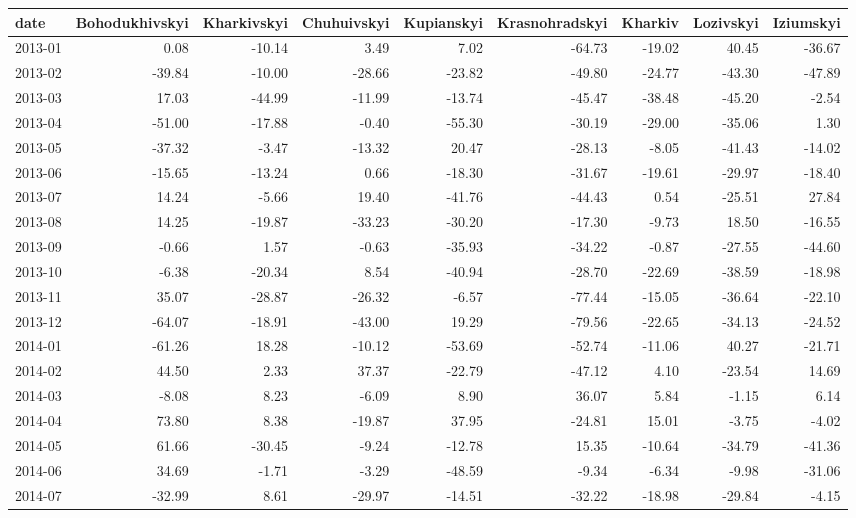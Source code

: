 \begin{table}[ht]
\centering
\begin{tabular}{lrrrrrrrr}
  \hline
date & Bohodukhivskyi & Kharkivskyi & Chuhuivskyi & Kupianskyi & Krasnohradskyi & Kharkiv & Lozivskyi & Iziumskyi \\ 
  \hline
2013-01 & 0.08 & -10.14 & 3.49 & 7.02 & -64.73 & -19.02 & 40.45 & -36.67 \\ 
  2013-02 & -39.84 & -10.00 & -28.66 & -23.82 & -49.80 & -24.77 & -43.30 & -47.89 \\ 
  2013-03 & 17.03 & -44.99 & -11.99 & -13.74 & -45.47 & -38.48 & -45.20 & -2.54 \\ 
  2013-04 & -51.00 & -17.88 & -0.40 & -55.30 & -30.19 & -29.00 & -35.06 & 1.30 \\ 
  2013-05 & -37.32 & -3.47 & -13.32 & 20.47 & -28.13 & -8.05 & -41.43 & -14.02 \\ 
  2013-06 & -15.65 & -13.24 & 0.66 & -18.30 & -31.67 & -19.61 & -29.97 & -18.40 \\ 
  2013-07 & 14.24 & -5.66 & 19.40 & -41.76 & -44.43 & 0.54 & -25.51 & 27.84 \\ 
  2013-08 & 14.25 & -19.87 & -33.23 & -30.20 & -17.30 & -9.73 & 18.50 & -16.55 \\ 
  2013-09 & -0.66 & 1.57 & -0.63 & -35.93 & -34.22 & -0.87 & -27.55 & -44.60 \\ 
  2013-10 & -6.38 & -20.34 & 8.54 & -40.94 & -28.70 & -22.69 & -38.59 & -18.98 \\ 
  2013-11 & 35.07 & -28.87 & -26.32 & -6.57 & -77.44 & -15.05 & -36.64 & -22.10 \\ 
  2013-12 & -64.07 & -18.91 & -43.00 & 19.29 & -79.56 & -22.65 & -34.13 & -24.52 \\ 
  2014-01 & -61.26 & 18.28 & -10.12 & -53.69 & -52.74 & -11.06 & 40.27 & -21.71 \\ 
  2014-02 & 44.50 & 2.33 & 37.37 & -22.79 & -47.12 & 4.10 & -23.54 & 14.69 \\ 
  2014-03 & -8.08 & 8.23 & -6.09 & 8.90 & 36.07 & 5.84 & -1.15 & 6.14 \\ 
  2014-04 & 73.80 & 8.38 & -19.87 & 37.95 & -24.81 & 15.01 & -3.75 & -4.02 \\ 
  2014-05 & 61.66 & -30.45 & -9.24 & -12.78 & 15.35 & -10.64 & -34.79 & -41.36 \\ 
  2014-06 & 34.69 & -1.71 & -3.29 & -48.59 & -9.34 & -6.34 & -9.98 & -31.06 \\ 
  2014-07 & -32.99 & 8.61 & -29.97 & -14.51 & -32.22 & -18.98 & -29.84 & -4.15 \\ 

\end{tabular}
\end{table}
